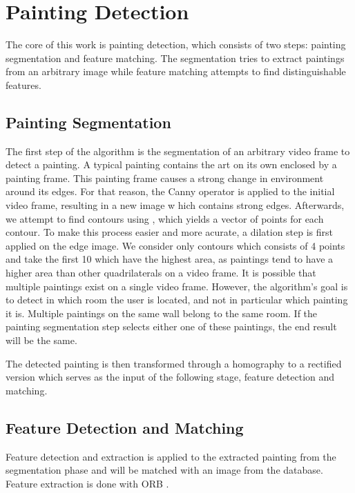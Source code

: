 \section{Painting Detection}
\label{sec:painting_detection}




	The core of this work is painting detection, which consists of two steps: painting segmentation and feature matching. The segmentation tries to extract paintings from an arbitrary image while feature matching attempts to find distinguishable features.

	\subsection{Painting Segmentation}
	The first step of the algorithm is the segmentation of an arbitrary video frame to detect a painting. A typical painting contains the art on its own enclosed by a painting frame. This painting frame causes a strong change in environment around its edges. For that reason, the Canny operator \cite{Canny1986} is applied to the initial video frame, resulting in a new image w
	hich contains strong edges. Afterwards, we attempt to find contours using \cite{SUZUKI198532}, which yields a vector of points for each contour. To make this process easier and more acurate, a dilation step is first applied on the edge image. We consider only contours which consists of 4 points and take the first 10 which have the highest area, as paintings tend to have a higher area than other quadrilaterals on a video frame. It is possible that multiple paintings exist on a single video frame. However, the algorithm's goal is to detect in which room the user is located, and not in particular which painting it is. Multiple paintings on the same wall belong to the same room. If the painting segmentation step selects either one of these paintings, the end result will be the same. 
	

	The detected painting is then transformed through a homography to a rectified version which serves as the input of the following stage, feature detection and matching.

	\subsection{Feature Detection and Matching}
	
	
	Feature detection and extraction is applied to the extracted painting from the segmentation phase and will be matched with an image from the database. Feature extraction is done with ORB \cite{Rublee2011}.

